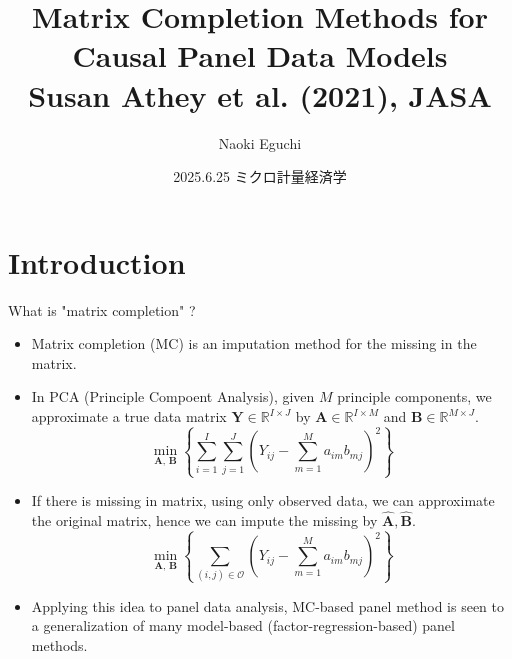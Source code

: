 \documentclass[xcolor=svgnames,aspectratio=169]{beamer}
\begin{document}
 

\title{Matrix Completion Methods for Causal Panel Data Models \\ \small{Susan Athey et al. (2021), JASA}}
\author{Naoki Eguchi}          
\date{2025.6.25 ミクロ計量経済学}

\begin{frame}                  
    \titlepage                     
\end{frame}

\section{Introduction}

\begin{frame}{What is "matrix completion" ?}
    \begin{itemize}
        \item Matrix completion (MC) is an imputation method for the missing in the matrix.
        \item In PCA (Principle Compoent Analysis), given $M$ principle components, we approximate a true data matrix $\mathbf{Y}\in\mathbb{R}^{I\times J}$ by $\mathbf{A}\in\mathbb{R}^{I\times M}$ and $\mathbf{B}\in\mathbb{R}^{M\times J}$.
        \[
        \min_{\mathbf{A},\,\mathbf{B}}\left\{
        \sum_{i=1}^{I}\sum_{j=1}^{J}\left(Y_{ij}-\sum_{m=1}^{M}a_{im}b_{mj}\right)^2
        \right\}
        \]
        \item If there is missing in matrix, using only observed data, we can approximate the original matrix, hence we can impute the missing by $\mathbf{\hat{A},\hat{B}}$.
        \[
        \min_{\mathbf{A},\,\mathbf{B}}\left\{
        \sum_{(i,j)\in \mathcal{O}}\left(Y_{ij}-\sum_{m=1}^{M}a_{im}b_{mj}\right)^2
        \right\}
        \]
        \item Applying this idea to panel data analysis, MC-based panel method is seen to a generalization of many model-based (factor-regression-based) panel methods.
    \end{itemize}
\end{frame}
\end{document}
